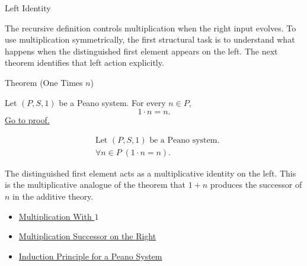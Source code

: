 \begin{topicbox}{Left Identity}
\begin{exposition}
The recursive definition controls multiplication when the right input evolves.
To use multiplication symmetrically, the first structural task is to
understand what happens when the distinguished first element appears on the
left. The next theorem identifies that left action explicitly.
\end{exposition}

\begin{theorembox}{Theorem (One Times \texorpdfstring{$n$}{n})}
\begin{theorem}
\label{thm:one-times-n}
Let $(P,S,1)$ be a Peano system. For every $n \in P$,
\[
1 \cdot n = n.
\]
\hyperref[prf:one-times-n]{Go to proof.}
\end{theorem}
\end{theorembox}

\begin{remark*}
\[
\begin{aligned}
&\text{Let } (P,S,1) \text{ be a Peano system.}\\
&\forall n \in P\;(1 \cdot n = n).
\end{aligned}
\]
\end{remark*}

\begin{remark*}[Interpretation]
The distinguished first element acts as a multiplicative identity on the left.
This is the multiplicative analogue of the theorem that $1+n$ produces the
successor of $n$ in the additive theory.
\end{remark*}

\begin{dependencies}
\begin{itemize}
  \item \hyperref[thm:multiplication-with-one]{Multiplication With $1$}
  \item \hyperref[thm:multiplication-successor-on-right]{Multiplication Successor on the Right}
  \item \hyperref[thm:induction-principle-for-peano-system]{Induction Principle for a Peano System}
\end{itemize}
\end{dependencies}
\end{topicbox}

